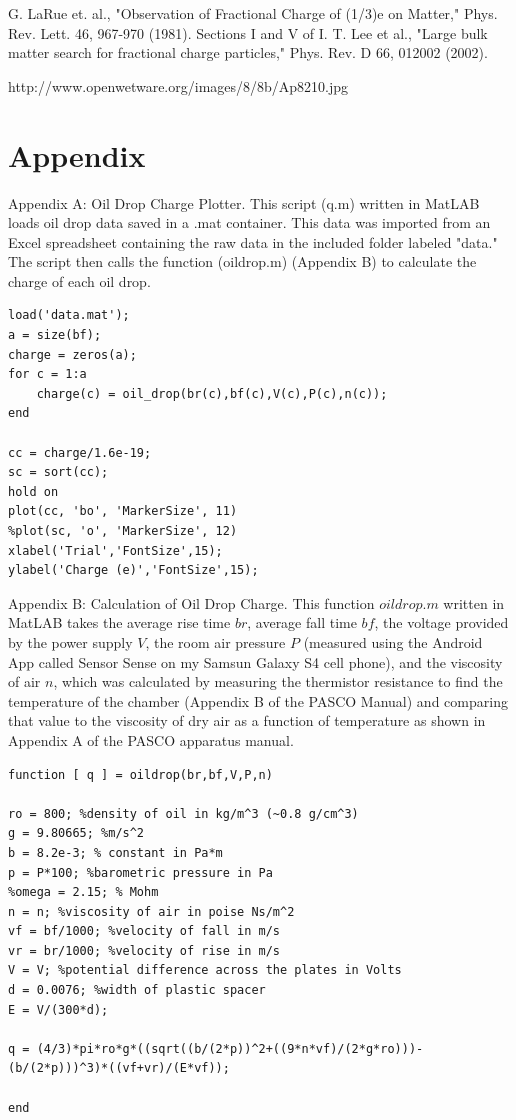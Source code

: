\documentclass[11pt, oneside]{article}   	%
\begin{document}
G. LaRue et. al., "Observation of Fractional Charge of (1/3)e on Matter," Phys. Rev. Lett. 46, 967-970 (1981).
Sections I and V of I. T. Lee et al., "Large bulk matter search for fractional charge particles," Phys. Rev. D 66, 012002 (2002).

http://www.openwetware.org/images/8/8b/Ap8210.jpg

\section{Appendix}

Appendix A: Oil Drop Charge Plotter. This script (q.m) written in MatLAB loads oil drop data saved in a .mat container. This data was imported from an Excel spreadsheet containing the raw data in the included folder labeled "data." The script then calls the function (oildrop.m) (Appendix B) to calculate the charge of each oil drop.

\begin{lstlisting}
load('data.mat');
a = size(bf);
charge = zeros(a);
for c = 1:a
    charge(c) = oil_drop(br(c),bf(c),V(c),P(c),n(c));
end

cc = charge/1.6e-19;
sc = sort(cc);
hold on
plot(cc, 'bo', 'MarkerSize', 11)
%plot(sc, 'o', 'MarkerSize', 12)
xlabel('Trial','FontSize',15);
ylabel('Charge (e)','FontSize',15);
\end{lstlisting}

Appendix B: Calculation of Oil Drop Charge. This function $oildrop.m$ written in MatLAB takes the average rise time $br$, average fall time $bf$, the voltage provided by the power supply $V$, the room air pressure $P$ (measured using the Android App called Sensor Sense on my Samsun Galaxy S4 cell phone), and the viscosity of air $n$, which was calculated by measuring the thermistor resistance to find the temperature of the chamber (Appendix B of the PASCO Manual) and comparing that value to the viscosity of dry air as a function of temperature as shown in Appendix A of the PASCO apparatus manual.

\begin{lstlisting}
function [ q ] = oildrop(br,bf,V,P,n)

ro = 800; %density of oil in kg/m^3 (~0.8 g/cm^3)
g = 9.80665; %m/s^2
b = 8.2e-3; % constant in Pa*m
p = P*100; %barometric pressure in Pa
%omega = 2.15; % Mohm
n = n; %viscosity of air in poise Ns/m^2
vf = bf/1000; %velocity of fall in m/s
vr = br/1000; %velocity of rise in m/s
V = V; %potential difference across the plates in Volts
d = 0.0076; %width of plastic spacer
E = V/(300*d);

q = (4/3)*pi*ro*g*((sqrt((b/(2*p))^2+((9*n*vf)/(2*g*ro)))-(b/(2*p)))^3)*((vf+vr)/(E*vf));

end
\end{lstlisting}
\end{document}

